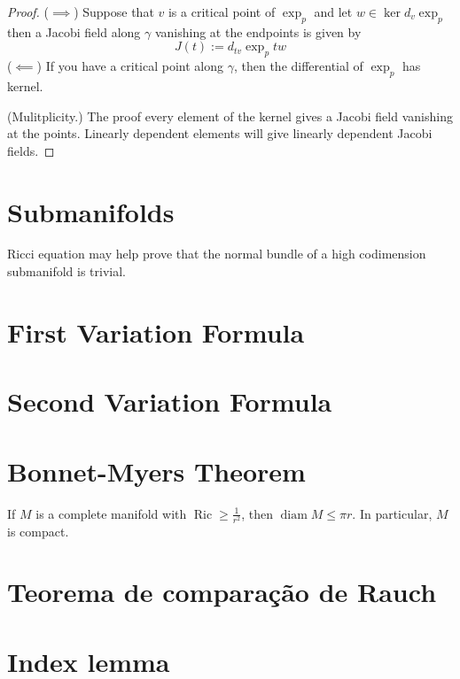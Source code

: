 \begin{proof}
($\implies$) Suppose that $v$ is a critical point of $\operatorname{exp}_p$ and 
let $w \in \ker d_v \operatorname{exp}_p$ then a Jacobi field along $\gamma$ 
vanishing at the endpoints is given by
$$
J(t):=d_{tv}\operatorname{exp}_ptw
$$
($\impliedby$) If you have a critical point along $\gamma$, then the 
differential of $\operatorname{exp}_p$ has kernel.

(Mulitplicity.) The proof every element of the kernel gives a Jacobi
 field vanishing at the points. Linearly dependent elements will give 
 linearly dependent Jacobi fields.
\end{proof}
\section{Submanifolds}
\label{section-submanifolds}

\begin{remark}
\label{remark-ricci-equation}
Ricci equation may help prove that the normal bundle of a high codimension
submanifold is trivial.
\end{remark}
\section{First Variation Formula}
\label{section-first-variation}

\section{Second Variation Formula}
\label{section-second-variation}


\section{Bonnet-Myers Theorem}
\label{subsection-bonnet-myers}

\begin{theorem}
\label{theorem-bonnet-myers}
If $M$ is a complete manifold with $\operatorname{Ric} \geq \frac{1}{r^2}$, then
$\operatorname{diam}M\leq \pi r$. In particular, $M$ is compact.
\end{theorem}

\section{Teorema de comparação de Rauch}
\label{section-rauch}

\section{Index lemma}
\label{subsection-index-lemma}

